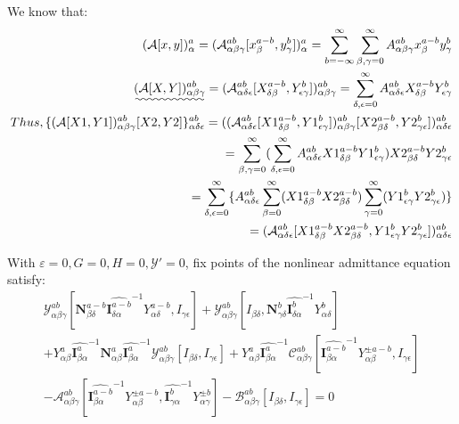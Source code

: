\documentclass{Note}
\begin{document}
We know that:
  \begin{equation}
\begin{aligned}
(\mathcal{A}[x,y])_{\alpha}^a=(\mathcal{A}_{\alpha\beta\gamma}^{ab}[x_{\beta}^{a-b},y_{\gamma}^b])_{\alpha}^a=\sum_{b=-\infty}^{\infty}\sum_{\beta,\gamma=0}^{\infty}A_{\alpha\beta\gamma}^{ab}x_{\beta}^{a-b}y_{\gamma}^b\\
\uwave{(\mathcal{A}[X,Y])_{\alpha\beta\gamma}^{ab}}=(\mathcal{A}_{\alpha\delta\epsilon}^{ab}[X_{\delta\beta}^{a-b},Y_{\epsilon\gamma}^b])_{\alpha\beta\gamma}^{ab}=\sum_{\delta,\epsilon=0}^{\infty}A_{\alpha\delta\epsilon}^{ab}X_{\delta\beta}^{a-b}Y_{\epsilon\gamma}^b\\
Thus,
\{(\mathcal{A}[X1,Y1])_{\alpha\beta\gamma}^{ab}[X2,Y2]\}_{\alpha\delta\epsilon}^{ab}=((\mathcal{A}_{\alpha\delta\epsilon}^{ab}[X1_{\delta\beta}^{a-b},Y1_{\epsilon\gamma}^b])_{\alpha\beta\gamma}^{ab}[X2_{\beta\delta}^{a-b},Y2_{\gamma\epsilon}^b])_{\alpha\delta\epsilon}^{ab}\\
=\sum_{\beta,\gamma=0}^{\infty} (\sum_{\delta,\epsilon=0}^{\infty}A_{\alpha\delta\epsilon}^{ab}X1_{\delta\beta}^{a-b}Y1_{\epsilon\gamma}^b)X2_{\beta\delta}^{a-b}Y2_{\gamma\epsilon}^b
\\
=\sum_{\delta,\epsilon=0}^{\infty}\{A_{\alpha\delta\epsilon}^{ab}\sum_{\beta=0}^{\infty}(X1_{\delta\beta}^{a-b}X2_{\beta\delta}^{a-b})\sum_{\gamma=0}^{\infty}(Y1_{\epsilon\gamma}^bY2_{\gamma\epsilon}^b)\}\\
=(\mathcal{A}_{\alpha\delta\epsilon}^{ab}[X1_{\delta\beta}^{a-b}X2_{\beta\delta}^{a-b},Y1_{\epsilon\gamma}^bY2_{\gamma\epsilon}^b])_{\alpha\delta\epsilon}^{ab}
\end{aligned}
\end{equation}


With $\varepsilon=0,G=0,H=0, \mathcal{Y}'=0$, fix points of the nonlinear admittance equation satisfy:
\begin{equation}
\begin{aligned}
\mathcal{Y}_{\alpha\beta\gamma}^{ab}[\textbf{N}_{\beta\delta}^{a-b} {\widehat{\textbf{I}_{\delta \alpha}^{a-b}}}^{-1}  Y_{\alpha\delta}^{a-b} ,I_{\gamma\epsilon} ]+\mathcal{Y}_{\alpha\beta\gamma}^{ab}[I_{\beta\delta},\textbf{N}_{\gamma\delta}^{b} {\widehat{\textbf{I}_{\delta \alpha}^{b}}}^{-1}  Y_{\alpha\delta}^{b} ]\\
+Y_{\alpha\beta}^{a} {\widehat{\textbf{I}_{\beta \alpha}^a}}^{-1}   \textbf{N}_{\alpha\beta}^a {\widehat{\textbf{I}_{\beta \alpha}^a}}^{-1} \mathcal{Y}_{\alpha\beta\gamma}^{ab}[I_{\beta\delta},I_{\gamma\epsilon} ]+Y_{\alpha\beta}^{a}{\widehat{\textbf{I}_{\beta \alpha}^a}}^{-1}  \mathcal{C}_{\alpha\beta\gamma}^{ab}[{\widehat{\textbf{I}_{\beta \alpha}^{a-b}}}^{-1}  Y_{\alpha\beta}^{\pm a-b}  ,I_{\gamma\epsilon} ]\\
-\mathcal{A}_{\alpha\beta\gamma}^{ab}[{\widehat{\textbf{I}_{\beta \alpha}^{a-b}}}^{-1}  Y_{\alpha\beta}^{\pm a-b} ,{\widehat{\textbf{I}_{\gamma \alpha}^{b}}}^{-1}  Y_{\alpha\gamma}^{\pm b} ] -\mathcal{B}_{\alpha\beta\gamma}^{ab}[I_{\beta\delta},I_{\gamma\epsilon} ]=0
\end{aligned}
\end{equation}
\end{document}
